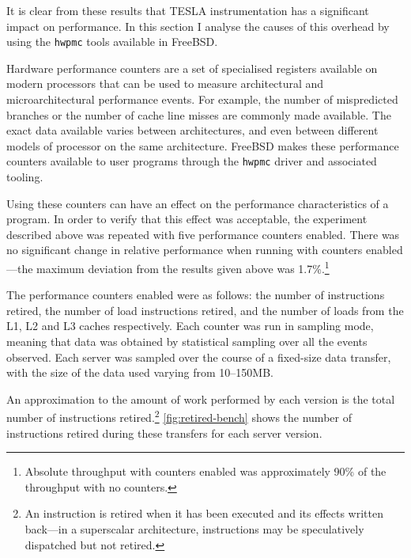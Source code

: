 It is clear from these results that TESLA instrumentation has a
significant impact on performance. In this section I analyse the causes
of this overhead by using the
\texttt{hwpmc} \cite{hwpmc}
tools available in FreeBSD.

Hardware performance counters are a set of specialised registers
available on modern processors that can be used to measure architectural
and microarchitectural performance events. For example, the number of
mispredicted branches or the number of cache line misses are commonly
made available. The exact data available varies between architectures,
and even between different models of processor on the same architecture.
FreeBSD makes these performance counters available to user programs
through the \texttt{hwpmc} driver and associated tooling.

Using these counters can have an effect on the performance
characteristics of a program. In order to verify that this effect was
acceptable, the experiment described above was repeated with five
performance counters enabled. There was no significant change in
relative performance when running with counters enabled---the maximum
deviation from the results given above was 1.7\%.\footnote{Absolute
throughput with counters enabled was approximately 90\% of the
throughput with no counters.}

The performance counters enabled were as follows: the number of
instructions retired, the number of load instructions retired, and the
number of loads from the L1, L2 and L3 caches respectively. Each counter
was run in sampling mode, meaning that data was obtained by statistical
sampling over all the events observed. Each server was sampled over the
course of a fixed-size data transfer, with the size of the data used
varying from 10--150MB.

An approximation to the amount of work performed by each version is the
total number of instructions retired.\footnote{An instruction is retired
when it has been executed and its effects written back---in a
superscalar architecture, instructions may be speculatively dispatched
but not retired.} \autoref{fig:retired-bench} shows the number of
instructions retired during these transfers for each server version.

